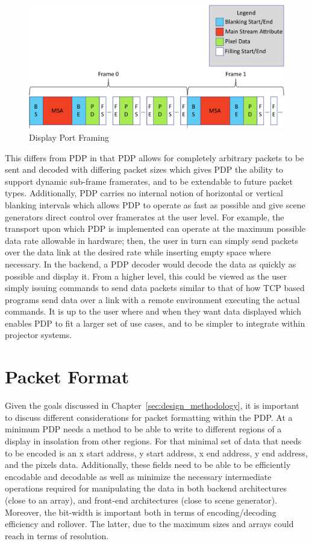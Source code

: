     \begin{figure}
        \centering
        \includegraphics[width=1.0\textwidth]{fig/display_port_framing.pdf}
        \caption{Display Port Framing}
        \label{fig:display_port_framing}
    \end{figure}

    This differs from PDP in that PDP allows for completely arbitrary packets to be sent and decoded with differing packet sizes which gives PDP the ability to support dynamic sub-frame framerates, and to be extendable to future packet types. Additionally, PDP carries no internal notion of horizontal or vertical blanking intervals which allows PDP to operate as fast as possible and give scene generators direct control over framerates at the user level. For example, the transport upon which PDP is implemented can operate at the maximum possible data rate allowable in hardware; then, the user in turn can simply send packets over the data link at the desired rate while inserting empty space where necessary. In the backend, a PDP decoder would decode the data as quickly as possible and display it. From a higher level, this could be viewed as the user simply issuing commands to send data packets similar to that of how TCP based programs send data over a link with a remote environment executing the actual commands. It is up to the user where and when they want data displayed which enables PDP to fit a larger set of use cases, and to be simpler to integrate within projector systems.

\section{Packet Format}
    \label{sec:packet_format}
    Given the goals discussed in Chapter~\ref{sec:design_methodology}, it is important to discuss different considerations for packet formatting within the PDP. At a minimum PDP needs a method to be able to write to different regions of a display in insolation from other regions. For that minimal set of data that needs to be encoded is an x start address, y start address, x end address, y end address, and the pixels data. Additionally, these fields need to be able to be efficiently encodable and decodable as well as minimize the necessary intermediate operations required for manipulating the data in both backend architectures (close to an array), and front-end architectures (close to scene generator). Moreover, the bit-width is important both in terms of encoding/decoding efficiency and rollover. The latter, due to the maximum sizes and arrays could reach in terms of resolution.

